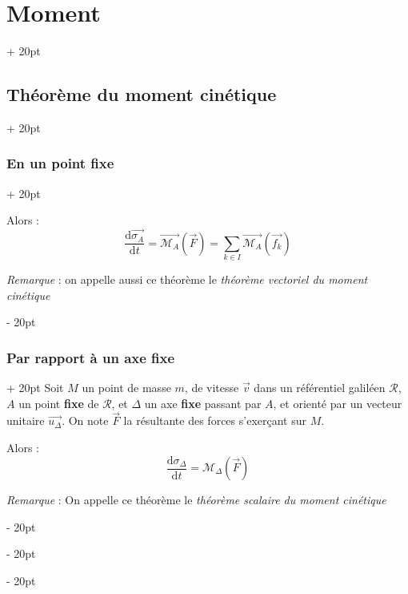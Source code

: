 \documentclass[a4paper, 12pt, twoside]{article}
\newcommand{\dt}[2][t]{\dfrac{\mathrm d #2}{\mathrm d #1}} %
\newcommand{\vect}{\overrightarrow}
\newcommand{\lr}[1]{\left( #1 \right)}
\newcommand{\ind}[1][20pt]{\advance\leftskip + #1}
\newcommand{\deind}[1][20pt]{\advance\leftskip - #1}
\newenvironment{indt}[2][20pt]{#2 \par \ind[#1]}{\par \deind} %
\begin{document}
\begin{indt}{\section{Moment}}
\begin{indt}{\subsection{Théorème du moment cinétique}}
\begin{indt}{\subsubsection{En un point fixe}}
                \vspace{6pt}
                
                Alors :
                \[
                    \dt{\vect{\sigma_A}} = \vect{\mathscr M_A}\!\lr{\vec F}
                    = \sum_{k \in I} \vect{\mathscr M_A}\!\lr{\vec{f_k}}
                \]

                \textit{Remarque} : on appelle aussi ce théorème le \textit{théorème vectoriel du moment cinétique}
            \end{indt}

            \vspace{12pt}
            
            \begin{indt}{\subsubsection{Par rapport à un axe fixe}}
                Soit $M$ un point de masse $m$, de vitesse $\vec v$ dans un référentiel galiléen $\mathscr R$, $A$ un point \textbf{fixe} de $\mathscr R$, et $\Delta$ un axe \textbf{fixe} passant par $A$, et orienté par un vecteur unitaire $\vect{u_\Delta}$.
                On note $\vec F$ la résultante des forces s'exerçant sur $M$.

                \vspace{6pt}
                
                Alors :
                \[
                    \dt{\sigma_\Delta} = \mathscr M_\Delta\!\lr{\vec F}
                \]

                \textit{Remarque} : On appelle ce théorème le \textit{théorème scalaire du moment cinétique}
            \end{indt}
        \end{indt}
    \end{indt}
    
    
    
\end{document}
